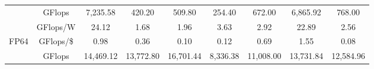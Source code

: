 \begin{table}[]
\begin{adjustwidth}{-1.0in}{-1.0in}
\begin{center}
{\begin{tabular}{cc||c|c|c|c|c|c|c}
                                  &  GFlops                                                                                 & 7,235.58                                                        & 420.20                                                           & 509.80                                                               & 254.40                                                        & 672.00                                                               & 6,865.92                                                               & 768.00                                                                 \\
                                  & \cellcolor[HTML]{EFEFEF}GFlops/W                                                       & \cellcolor[HTML]{EFEFEF}24.12                                   & \cellcolor[HTML]{EFEFEF}1.68                                     & \cellcolor[HTML]{EFEFEF}1.96                                         & \cellcolor[HTML]{EFEFEF}3.63                                  & \cellcolor[HTML]{EFEFEF}2.92                                         & \cellcolor[HTML]{EFEFEF}22.89                                          & \cellcolor[HTML]{EFEFEF}2.56                                           \\
\multirow{-3}{*}{FP64}            & GFlops/\$                                                                              & 0.98                                                            & 0.36                                                             & 0.10                                                                 & 0.12                                                          & 0.69                                                                 & 1.55                                                                   & 0.08                                                                   \\ \hline
                                  & \cellcolor[HTML]{EFEFEF}GFlops                                                         & \cellcolor[HTML]{EFEFEF}14,469.12                               & \cellcolor[HTML]{EFEFEF}13,772.80                                & \cellcolor[HTML]{EFEFEF}16,701.44                                    & \cellcolor[HTML]{EFEFEF}8,336.38                              & \cellcolor[HTML]{EFEFEF}11,008.00                                    & \cellcolor[HTML]{EFEFEF}13,731.84                                      & \cellcolor[HTML]{EFEFEF}12,584.96                                      \\

\end{tabular}}
\end{center}
\end{adjustwidth}
\end{table}
